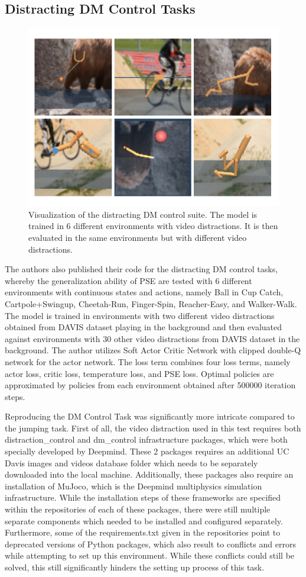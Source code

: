 \documentclass{usiinftr}
\begin{document}
\subsection{Distracting DM Control Tasks}
\begin{figure}[h]
    \centering
    \includegraphics[width = 0.6\linewidth]{figures/dm.png}
    \caption{Visualization of the distracting DM control suite. The model is trained in 6 different environments with video distractions. It is then evaluated in the same environments but with different video distractions. }
    \label{fig:DM}
\end{figure}
The authors also published their code for the distracting DM control tasks, whereby the generalization ability of PSE are tested with 6 different environments with continuous states and actions, namely Ball in Cup Catch, Cartpole+Swingup, Cheetah-Run, Finger-Spin, Reacher-Easy, and Walker-Walk. The model is trained in environments with two different video distractions obtained from DAVIS dataset playing in the background and then evaluated against environments with 30 other video distractions from DAVIS dataset in the background. The author utilizes Soft Actor Critic Network with clipped double-Q network for the actor network. The loss term combines four loss terms, namely actor loss, critic loss, temperature loss, and PSE loss. Optimal policies are approximated by policies from each environment obtained after 500000 iteration steps. 

Reproducing the DM Control Task was significantly more intricate compared to the jumping task. First of all, the video distraction used in this test requires both distraction\_control and dm\_control infrastructure packages, which were both specially developed by Deepmind. These 2 packages requires an additional UC Davis images and videos database folder which needs to be separately downloaded into the local machine. Additionally, these packages also require an installation of MuJoco, which is the Deepmind multiphysics simulation infrastructure. While the installation steps of these frameworks are specified within the repositories of each of these packages, there were still multiple separate components which needed to be installed and configured separately. Furthermore, some of the requirements.txt given in the repositories point to deprecated versions of Python packages, which also result to conflicts and errors while attempting to set up this environment. While these conflicts could still be solved, this still significantly hinders the setting up process of this task. 
\end{document}
